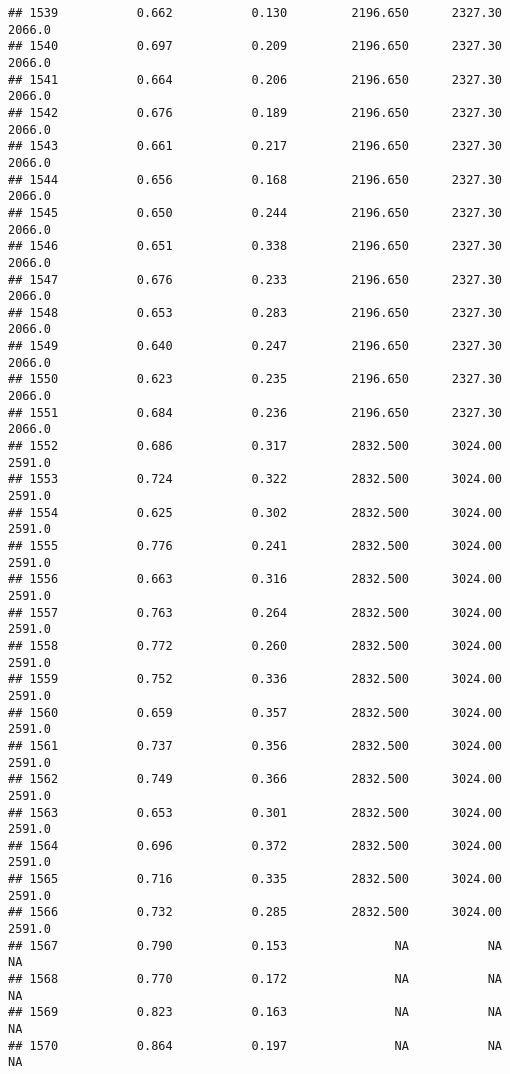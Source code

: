 \documentclass[
]{article}
\begin{document}
\begin{verbatim}
## 1539           0.662           0.130         2196.650      2327.30       2066.0
## 1540           0.697           0.209         2196.650      2327.30       2066.0
## 1541           0.664           0.206         2196.650      2327.30       2066.0
## 1542           0.676           0.189         2196.650      2327.30       2066.0
## 1543           0.661           0.217         2196.650      2327.30       2066.0
## 1544           0.656           0.168         2196.650      2327.30       2066.0
## 1545           0.650           0.244         2196.650      2327.30       2066.0
## 1546           0.651           0.338         2196.650      2327.30       2066.0
## 1547           0.676           0.233         2196.650      2327.30       2066.0
## 1548           0.653           0.283         2196.650      2327.30       2066.0
## 1549           0.640           0.247         2196.650      2327.30       2066.0
## 1550           0.623           0.235         2196.650      2327.30       2066.0
## 1551           0.684           0.236         2196.650      2327.30       2066.0
## 1552           0.686           0.317         2832.500      3024.00       2591.0
## 1553           0.724           0.322         2832.500      3024.00       2591.0
## 1554           0.625           0.302         2832.500      3024.00       2591.0
## 1555           0.776           0.241         2832.500      3024.00       2591.0
## 1556           0.663           0.316         2832.500      3024.00       2591.0
## 1557           0.763           0.264         2832.500      3024.00       2591.0
## 1558           0.772           0.260         2832.500      3024.00       2591.0
## 1559           0.752           0.336         2832.500      3024.00       2591.0
## 1560           0.659           0.357         2832.500      3024.00       2591.0
## 1561           0.737           0.356         2832.500      3024.00       2591.0
## 1562           0.749           0.366         2832.500      3024.00       2591.0
## 1563           0.653           0.301         2832.500      3024.00       2591.0
## 1564           0.696           0.372         2832.500      3024.00       2591.0
## 1565           0.716           0.335         2832.500      3024.00       2591.0
## 1566           0.732           0.285         2832.500      3024.00       2591.0
## 1567           0.790           0.153               NA           NA           NA
## 1568           0.770           0.172               NA           NA           NA
## 1569           0.823           0.163               NA           NA           NA
## 1570           0.864           0.197               NA           NA           NA

\end{verbatim}
\end{document}
